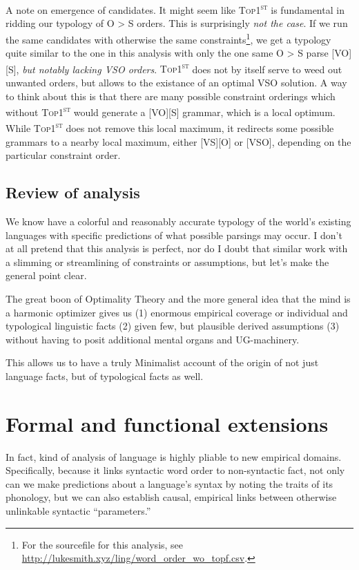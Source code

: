 \documentclass{article}
\newcommand{\topf}{\textsc{Top1\textsuperscript{st}}}
\begin{document}
A note on emergence of candidates.
It might seem like {\topf} is fundamental in ridding our typology of O {\textgreater} S orders.
This is surprisingly \emph{not the case}.
If we run the same candidates with otherwise the same constraints\footnote{For the sourcefile for this analysis, see \href{http://lukesmith.xyz/ling/word_order_wo_topf.csv}{http://lukesmith.xyz/ling/word\_order\_wo\_topf.csv}.}, we get a typology quite similar to the one in this analysis with only the one same O {\textgreater} S parse [VO][S], \emph{but notably lacking VSO orders}.
{\topf} does not by itself serve to weed out unwanted orders, but allows to the existance of an optimal VSO solution.
A way to think about this is that there are many possible constraint orderings which without {\topf} would generate a [VO][S] grammar, which is a local optimum.
While {\topf} does not remove this local maximum, it redirects some possible grammars to a nearby local maximum, either [VS][O] or [VSO], depending on the particular constraint order.

\subsection{Review of analysis}

We know have a colorful and reasonably accurate typology of the world's existing languages with specific predictions of what possible parsings may occur.
I don't at all pretend that this analysis is perfect, nor do I doubt that similar work with a slimming or streamlining of constraints or assumptions, but let's make the general point clear.

The great boon of Optimality Theory and the more general idea that the mind is a harmonic optimizer gives us (1) enormous empirical coverage or individual and typological linguistic facts (2) given few, but plausible derived assumptions (3) without having to posit additional mental organs and UG-machinery.

This allows us to have a truly Minimalist account of the origin of not just language facts, but of typological facts as well.

\section{Formal and functional extensions\label{exten}}

In fact, kind of analysis of language is highly pliable to new empirical domains.
Specifically, because it links syntactic word order to non-syntactic fact, not only can we make predictions about a language's syntax by noting the traits of its phonology, but we can also establish causal, empirical links between otherwise unlinkable syntactic ``parameters.''
\end{document}
